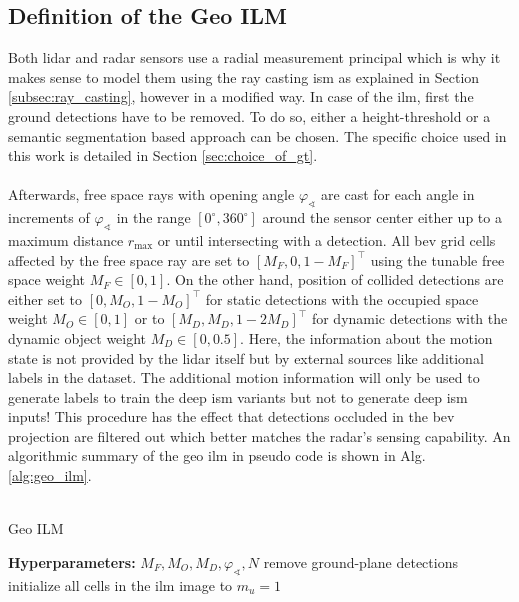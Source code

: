 \subsection{Definition of the Geo ILM}
\label{subsec:method_geo_ilm}
Both lidar and radar sensors use a radial measurement principal which is why it makes sense to model them using the ray casting \gls{ism} as explained in Section \ref{subsec:ray_casting}, however in a modified way. In case of the \gls{ilm}, first the ground detections have to be removed. To do so, either a height-threshold or a semantic segmentation based approach can be chosen. The specific choice used in this work is detailed in Section \ref{sec:choice_of_gt}.
\\\\
Afterwards, free space rays with opening angle $\varphi_\sphericalangle$ are cast for each angle in increments of $\varphi_\sphericalangle$ in the range $[0^\circ, 360^\circ]$ around the sensor center either up to a maximum distance $r_\text{max}$ or until intersecting with a detection. All \gls{bev} grid cells affected by the free space ray are set to $[M_F,0,1-M_F]^\top$ using the tunable free space weight $M_F \in [0,1]$. On the other hand, position of collided detections are either set to $[0,M_O,1-M_O]^\top$ for static detections with the occupied space weight $M_O \in [0,1]$ or to $[M_D, M_D, 1-2M_D]^\top$ for dynamic detections with the dynamic object weight $M_D \in [0,0.5]$. Here, the information about the motion state is not provided by the lidar itself but by external sources like additional labels in the dataset. The additional motion information will only be used to generate labels to train the deep \gls{ism} variants but not to generate deep \gls{ism} inputs! This procedure has the effect that detections occluded in the \gls{bev} projection are filtered out which better matches the radar's sensing capability. An algorithmic summary of the geo \gls{ilm} in pseudo code is shown in Alg. \ref{alg:geo_ilm}.
\\\\
\begin{algorithm}[H]
	\caption{\label{alg:geo_ilm}Geo ILM}
	\textbf{Hyperparameters:} $M_F, M_O, M_D, \varphi_\sphericalangle, N$\;
	remove ground-plane detections\;
	initialize all cells in the \gls{ilm} image to $m_u=1$\;
\end{algorithm}
